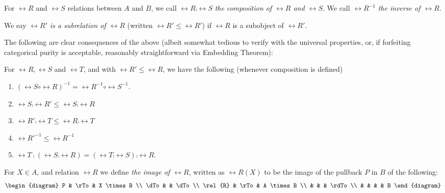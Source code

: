 \begin{definition}\label{relation_inverse}
For $\rel{R}$ and $\rel{S}$ relations between $A$ and $B$, we call
$\rel{R} \comp \rel{S}$ \emph{the composition of $\rel{R}$ and 
$\rel{S}$}. We call $\rel{R}^{-1}$ \emph{the inverse of $\rel{R}$}.
\end{definition}

\begin{definition}\label{subrelation}
We say \emph{$\rel{R}'$ is a subrelation of $\rel{R}$} (written 
$\rel{R}' \leq \rel{R}'$) if $\rel{R}$ is a subobject of 
$\rel{R}'$.
\end{definition}

The following are clear consequences of the above (albeit somewhat
tedious to verify with the universal properties, or, if forfeiting
categorical purity is acceptable, reasonably straightforward via 
Embedding Theorem):

\begin{prop}\label{prop_2_47}
For $\rel{R}, \rel{S}$ and $\rel{T}$, and with $\rel{R}' \leq 
\rel{R}$, we have the following (whenever composition is defined)
\begin{enumerate}
\item $(\rel{S} \circ \rel{R})^{-1} = \rel{R}^{-1} \circ 
\rel{S}^{-1}$.

\item $\rel{S} \comp \rel{R}' \leq \rel{S} \comp \rel{R}$

\item $\rel{R}' \comp \rel{T} \leq \rel{R} \comp \rel{T}$

\item $\rel{R}'^{-1} \leq \rel{R}^{-1}$

\item $\rel{T} \comp (\rel{S} \comp \rel{R}) = (\rel{T} \comp 
\rel{S}) \comp \rel{R}$.
\end{enumerate}
\end{prop}

\begin{definition}\label{relation_range}
For $X \in A$, and relation $\rel{R}$ we define \emph{the image
of $\rel{R}$}, written as $\rel{R}(X)$ to be the image of the 
pullback $P$ in $B$ of the following:
\[
\begin{diagram}
P & \rTo & X \times B \\
\dTo &   & \dTo \\
\rel{R} & \rTo & A \times B \\
    &  &  &  \rdTo \\
    &  &  &   & B
\end{diagram}
\]
\end{definition}

